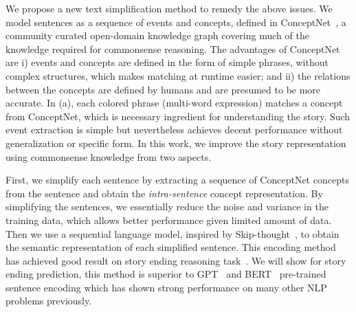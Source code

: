 
We propose a new text simplification method to remedy the above issues. 
We model sentences as a sequence of events and concepts, defined in
ConceptNet~\cite{speer2017conceptnet}, a community curated open-domain 
knowledge graph covering much of the knowledge required for commonsense 
reasoning.
The advantages of ConceptNet are i) events and concepts are defined
in the form of simple phrases, without complex structures, 
which makes matching at runtime easier; and ii) the relations
between the concepts are defined by humans and are presumed to be
more accurate.
In (a), each colored phrase (multi-word expression) 
matches a concept from ConceptNet,
which is necessary ingredient for understanding the story.
Such event extraction is simple but nevertheless achieves 
decent performance without generalization or specific form. 
In this work, we improve the story representation
using commonsense knowledge from two aspects.

First, we simplify each sentence by extracting a sequence of
ConceptNet concepts from the sentence
and obtain the {\em intra-sentence} concept representation.
By simplifying the sentences, we essentially reduce the noise
and variance in the training data, which allows better performance
 given limited amount of data.
Then we use a sequential language model, inspired by
Skip-thought~\cite{kiros2015skip}, to obtain the
semantic representation of each simplified sentence. 
This encoding method has achieved good result on story ending 
reasoning task~\cite{roemmele2017rnn}. 
We will show for story ending prediction, this method is superior 
to GPT~\cite{radford2018improving} and BERT~\cite{devlin2018bert} pre-trained 
sentence encoding which has shown strong performance on many other 
NLP problems previously. 


